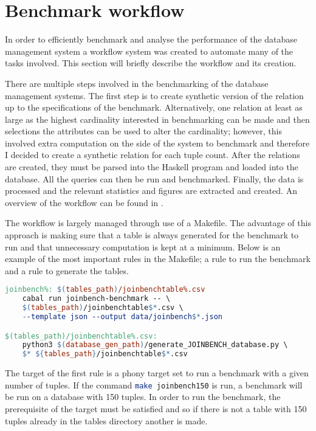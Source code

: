 \section{Benchmark workflow}\label{sec:benchmark:workflow}
In order to efficiently benchmark and analyse the performance of the database
management system a workflow system was created to automate many of the tasks
involved. This section will briefly describe the workflow and its creation.

There are multiple steps involved in the benchmarking of the database management
systems. The first step is to create synthetic version of the
 relation up to the specifications of the benchmark.
Alternatively, one relation at least as large as the highest cardinality
interested in benchmarking can be made and then selections the
 attributes can be used to alter the cardinality;
however, this involved extra computation on the side of the system to benchmark
and therefore I decided to create a synthetic relation for each tuple count.
After the relations are created, they must be parsed into the Haskell program
and loaded into the database. All the queries can then be run and benchmarked.
Finally, the data is processed and the relevant statistics and figures are
extracted and created. An overview of the workflow can be found in
.

The workflow is largely managed through use of a Makefile. The advantage of this
approach is making sure that a table is always generated for the benchmark to
run and that unnecessary computation is kept at a minimum. Below is an example
of the most important rules in the Makefile; a rule to run the benchmark and a
rule to generate the tables.

\begin{lstlisting}[language=make]
joinbench%: $(tables_path)/joinbenchtable%.csv
	cabal run joinbench-benchmark -- \
    $(tables_path)/joinbenchtable$*.csv \ 
    --template json --output data/joinbench$*.json

$(tables_path)/joinbenchtable%.csv:
	python3 $(database_gen_path)/generate_JOINBENCH_database.py \
    $* ${tables_path}/joinbenchtable$*.csv
\end{lstlisting}

The target of the first rule is a phony target set to run a benchmark with a
given number of tuples. If the command \lstinline[language=bash]{make joinbench150}
is run, a benchmark will be run on a database with 150 tuples. In
order to run the benchmark, the prerequisite of the target must be satisfied and
so if there is not a table with 150 tuples already in the tables directory
another is made.

